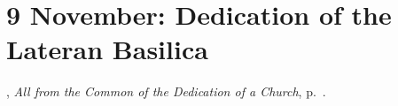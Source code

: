 {
  \section{9 November: Dedication of the Lateran Basilica}
  {\noindent\printhymnsundayrefnospace{}, \emph{All from the Common of the Dedication of a Church}, p.~\pageref{commondedicationofchurch}.}
}